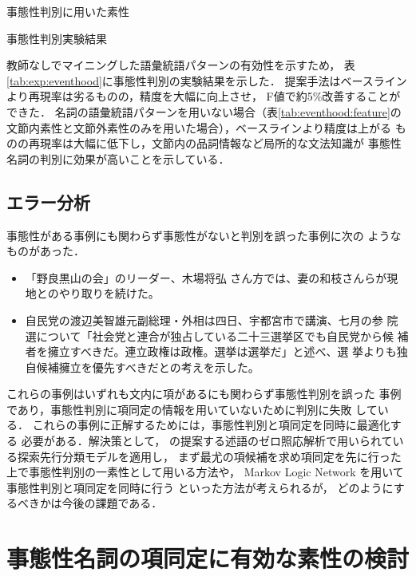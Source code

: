 \documentclass[japanese]{jnlp_1.4}
\begin{document}
\begin{table}[b]
\caption{事態性判別に用いた素性}
\label{tab:eventhood:feature}

\end{table}
\begin{table}[b]
\caption{事態性判別実験結果}
\label{tab:exp:eventhood}

\end{table}

教師なしでマイニングした語彙統語パターンの有効性を示すため，
表\ref{tab:exp:eventhood}に事態性判別の実験結果を示した．
提案手法はベースラインより再現率は劣るものの，精度を大幅に向上させ，
F値で約5\%改善することができた．
名詞の語彙統語パターンを用いない場合（表\ref{tab:eventhood:feature}の
文節内素性と文節外素性のみを用いた場合），ベースラインより精度は上がる
ものの再現率は大幅に低下し，文節内の品詞情報など局所的な文法知識が
事態性名詞の判別に効果が高いことを示している．



\subsection{エラー分析}

事態性がある事例にも関わらず事態性がないと判別を誤った事例に次の
ようなものがあった．
\begin{itemize}
\item 「野良黒山の会」のリーダー、木場将弘
  さん方では、妻の和枝さんらが現地とのやり取りを続けた。
\item 自民党の渡辺美智雄元副総理・外相は四日、宇都宮市で講演、七月の参
  院選について「社会党と連合が独占している二十三選挙区でも自民党から候
  補者を擁立すべきだ。連立政権は政権。選挙は選挙だ」と述べ、選
  挙よりも独自候補擁立を優先すべきだとの考えを示した。
\end{itemize}
これらの事例はいずれも文内に項があるにも関わらず事態性判別を誤った
事例であり，事態性判別に項同定の情報を用いていないために判別に失敗
している．
これらの事例に正解するためには，事態性判別と項同定を同時に最適化する
必要がある．解決策として，\cite{iida:2006:ACL}
の提案する述語のゼロ照応解析で用いられている探索先行分類モデルを適用し，
まず最尤の項候補を求め項同定を先に行った上で事態性判別の一素性として用いる方法や，
Markov Logic Network を用いて事態性判別と項同定を同時に行う
\cite{meza-ruiz:2009:NAACL-HLT} といった方法が考えられるが，
どのようにするべきかは今後の課題である．



\section{事態性名詞の項同定に有効な素性の検討}
\label{sec:syntax}
\end{document}
